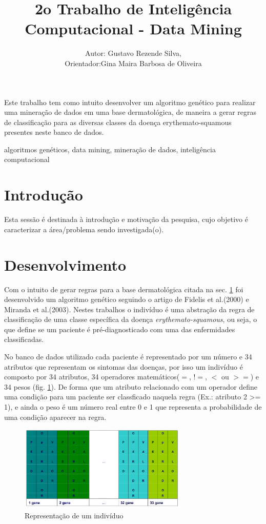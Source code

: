 \documentclass[11pt]{article}
\title{2o Trabalho de Inteligência Computacional - Data Mining}
\author{Autor: Gustavo Rezende Silva,\\ Orientador:Gina Maira Barbosa
de Oliveira}
\begin{document}
\maketitle


\begin{resumo}
Este trabalho tem como intuito desenvolver um algoritmo genético para realizar
uma mineração de dados em uma base dermatológica, de maneira a gerar regras de
classificação para as diversas classes da doença erythemato-squamous presentes
neste banco de dados.
\end{resumo}

\begin{palavraschave}
algoritmos genéticos, data mining, mineração de dados, inteligência computacional
\end{palavraschave}

\section{Introdução}
\label{sec:intro}

Esta sessão é destinada à introdução e motivação da pesquisa, cujo objetivo é caracterizar a área/problema sendo investigada(o).

\section{Desenvolvimento}
\label{sec:desen}

Com o intuito de gerar regras para a base dermatológica citada na sec.
\ref{sec:intro} foi desenvolvido um algoritmo genético seguindo o artigo de
Fidelis et al.(2000) e Miranda et al.(2003). Nestes trabalhos o indivíduo é uma
abstração da regra de classificação de uma classe específica da doença
\textit{erythemato-squamous}, ou seja, o que define se um paciente é
pré-diagnosticado com uma das enfermidades classificadas.

No banco de dados utilizado cada paciente é representado por um número e 34
atributos que representam os sintomas das doenças, por isso um indivíduo é
composto por 34 atributos, 34 operadores matemáticos($=$, $!=$, $<$ ou $>=$) e
34 pesos (fig. \ref{fig:individuo}). De forma que um atributo relacionado com um
operador define uma condição para um paciente ser classficado naquela regra
(Ex.: atributo 2 >= 1), e ainda o peso é um número real entre 0 e 1 que
representa a probabilidade de uma condição aparecer na regra.

\begin{figure}
  \centering
  \includegraphics[width=8cm]{individuo.png}
  \caption{Representação de um indivíduo}
  \label{fig:individuo}
\end{figure}
\end{document}
